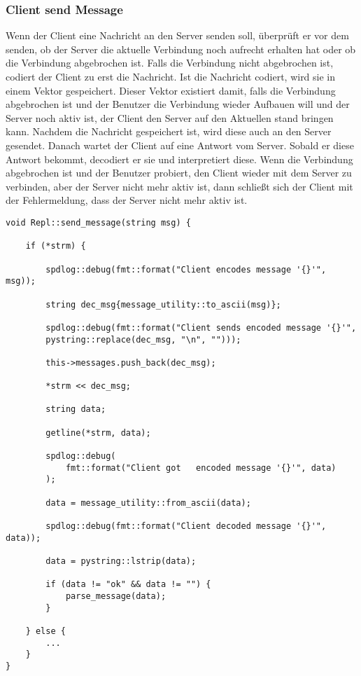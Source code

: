\subsubsection{Client send Message}

Wenn der Client eine Nachricht an den Server senden soll, überprüft er vor dem senden, ob der Server die aktuelle Verbindung noch aufrecht erhalten hat oder ob die Verbindung abgebrochen ist. Falls die Verbindung nicht abgebrochen ist, codiert der Client zu erst die Nachricht. Ist die Nachricht codiert, wird sie in einem Vektor gespeichert. Dieser Vektor existiert damit, falls die Verbindung abgebrochen ist und der Benutzer die Verbindung wieder Aufbauen will und der Server noch aktiv ist, der Client den Server auf den Aktuellen stand bringen kann. Nachdem die Nachricht gespeichert ist, wird diese auch an den Server gesendet. Danach wartet der Client auf eine Antwort vom Server. Sobald er diese Antwort bekommt, decodiert er sie und interpretiert diese. Wenn die Verbindung abgebrochen ist und der Benutzer probiert, den Client wieder mit dem Server zu verbinden, aber der Server nicht mehr aktiv ist, dann schließt sich der Client mit der Fehlermeldung, dass der Server nicht mehr aktiv ist.

\vspace{10mm}
\begin{addmargin}[-3em]{0em}
\begin{verbatim}
void Repl::send_message(string msg) {

    if (*strm) {
    
        spdlog::debug(fmt::format("Client encodes message '{}'", msg));

        string dec_msg{message_utility::to_ascii(msg)};

        spdlog::debug(fmt::format("Client sends encoded message '{}'", 
        pystring::replace(dec_msg, "\n", "")));

        this->messages.push_back(dec_msg);

        *strm << dec_msg;

        string data;

        getline(*strm, data);

        spdlog::debug(
            fmt::format("Client got   encoded message '{}'", data)
        );

        data = message_utility::from_ascii(data);

        spdlog::debug(fmt::format("Client decoded message '{}'", data));

        data = pystring::lstrip(data);

        if (data != "ok" && data != "") {
            parse_message(data);
        }
        
    } else {
        ...
    }
}
\end{verbatim}
\end{addmargin}



